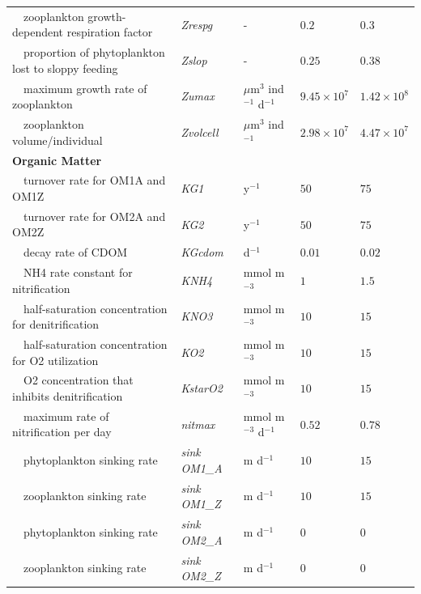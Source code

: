 \documentclass[review]{elsarticle}\usepackage[]{graphicx}\usepackage[]{color}
\begin{document}
\begin{table}[!tbp]
{\begin{center}
\begin{tabular}{lllll}
~~zooplankton growth-dependent respiration factor&\textit{Zrespg}&-&$0.2$&$0.3$\tabularnewline
~~proportion of phytoplankton lost to sloppy feeding&\textit{Zslop}&-&$0.25$&$0.38$\tabularnewline
~~maximum growth rate of zooplankton&\textit{Zumax}&$\mu$m$^3$ ind$^{-1}$ d$^{-1}$&$9.45\times 10^{7}$&$1.42\times 10^{8}$\tabularnewline
~~zooplankton volume/individual&\textit{Zvolcell}&$\mu$m$^3$ ind$^{-1}$&$2.98\times 10^{7}$&$4.47\times 10^{7}$\tabularnewline
\hline
{\bfseries Organic Matter}&&&&\tabularnewline
~~turnover rate for OM1A and OM1Z&\textit{KG1}&y$^{-1}$&$50$&$75$\tabularnewline
~~turnover rate for OM2A and OM2Z&\textit{KG2}&y$^{-1}$&$50$&$75$\tabularnewline
~~decay rate of CDOM&\textit{KGcdom}&d$^{-1}$&$0.01$&$0.02$\tabularnewline
~~NH4 rate constant for nitrification&\textit{KNH4}&mmol m$^{-3}$&$1$&$1.5$\tabularnewline
~~half-saturation concentration for denitrification&\textit{KNO3}&mmol m$^{-3}$&$10$&$15$\tabularnewline
~~half-saturation concentration for O2 utilization&\textit{KO2}&mmol m$^{-3}$&$10$&$15$\tabularnewline
~~O2 concentration that inhibits denitrification&\textit{KstarO2}&mmol m$^{-3}$&$10$&$15$\tabularnewline
~~maximum rate of nitrification per day&\textit{nitmax}&mmol m$^{-3}$ d$^{-1}$&$0.52$&$0.78$\tabularnewline
~~phytoplankton sinking rate&\textit{sink OM1\_A}&m d$^{-1}$&$10$&$15$\tabularnewline
~~zooplankton sinking rate&\textit{sink OM1\_Z}&m d$^{-1}$&$10$&$15$\tabularnewline
~~phytoplankton sinking rate&\textit{sink OM2\_A}&m d$^{-1}$&$0$&$0$\tabularnewline
~~zooplankton sinking rate&\textit{sink OM2\_Z}&m d$^{-1}$&$0$&$0$\tabularnewline
\hline
\end{tabular}\end{center}}
\end{table}
\end{document}
